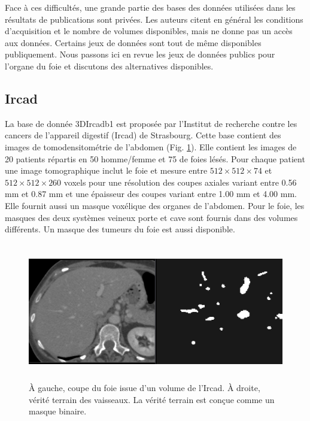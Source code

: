 Face à ces difficultés, une grande partie des bases des données utilisées dans les résultats de publications sont privées. Les auteurs citent en général les conditions d'acquisition et le nombre de volumes disponibles, mais ne donne pas un accès aux données. Certains jeux de données sont tout de même disponibles publiquement. Nous passons ici en revue les jeux de données publics pour l'organe du foie et discutons des alternatives disponibles.

\subsection{Ircad}

La base de donnée 3DIrcadb1 est proposée par l'Institut de recherche contre les cancers de l'appareil digestif (Ircad) de Strasbourg. Cette base contient des images de tomodensitométrie de l'abdomen (Fig. \ref{fig:Ircad_examples}). Elle contient les images de 20 patients répartis en 50 \percent{}homme/femme et 75 \percent{}de foies lésés. Pour chaque patient une image tomographique inclut le foie et mesure entre $512 \times 512 \times 74$ et $512 \times 512 \times 260$ voxels pour une résolution des coupes axiales variant entre 0.56 mm et 0.87 mm et une épaisseur des coupes variant entre 1.00 mm et 4.00 mm. Elle fournit aussi un masque voxélique des organes de l'abdomen. Pour le foie, les masques des deux systèmes veineux porte et cave sont fournis dans des volumes différents. Un masque des tumeurs du foie est aussi disponible.

\begin{figure}
    \centering
    \includegraphics[height=6cm]{Images/Ircad_examples.png}
    \caption{À gauche, coupe du foie issue d'un volume de l'Ircad. À droite, vérité terrain des vaisseaux. La vérité terrain est conçue comme un masque binaire.}
    \label{fig:Ircad_examples}
\end{figure}


